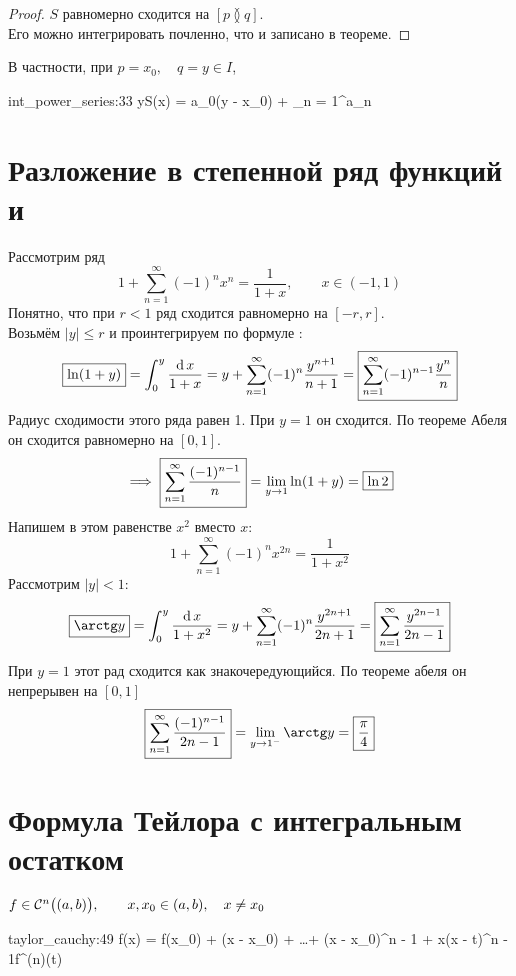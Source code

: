 \begin{proof}
	$ S $ равномерно сходится на $ [p \between q] $. \\
	Его можно интегрировать почленно, что и записано в теореме.
\end{proof}

\begin{statement}
	В частности, при $ p = x_0, \quad q = y \in I $,
	\begin{equ}{int_power_series:33}
		y{S(x)} = a_0(y - x_0) + \sum_{n = 1}^\infty a_n 
	\end{equ}
\end{statement}

\section{Разложение в степенной ряд функций  и }

Рассмотрим ряд
$$ 1 + \sum_{n = 1}^\infty (-1)^nx^n = \frac1{1 + x}, \qquad x \in (-1, 1) $$
Понятно, что при $ r < 1 $ ряд сходится равномерно на $ [-r, r] $. \\
Возьмём $ |y| \le r $ и проинтегрируем по формуле :
$$ \boxed{\ln (1 + y)} = \dfint0y{1 + x} = y + \sum_{n = 1}^\infty (-1)^n \frac{y^{n + 1}}{n + 1} = \boxed{\sum_{n = 1}^\infty (-1)^{n - 1} \frac{y^n}n} $$
Радиус сходимости этого ряда равен 1. При $ y = 1 $ он сходится. По теореме Абеля он сходится равномерно на $ [0, 1] $.
$$ \implies \boxed{\sum_{n = 1}^\infty \frac{(-1)^{n - 1}}n} = \liml{y \to 1} \ln(1 + y) = \boxed{\ln 2} $$
Напишем в этом равенстве $ x^2 $ вместо $ x $:
$$ 1 + \sum_{n = 1}^\infty (-1)^n x^{2n} = \frac1{1 + x^2} $$
Рассмотрим $ |y| < 1 $:
$$ \boxed{\arctg y} = \dfint0y{1 + x^2} = y + \sum_{n = 1}^\infty (-1)^n \frac{y^{2n + 1}}{2n + 1} = \boxed{\sum_{n = 1}^\infty \frac{y^{2n - 1}}{2n - 1}} $$
При $ y = 1 $ этот рад сходится как знакочередующийся. По теореме абеля он непрерывен на $ [0, 1] $
$$ \boxed{\sum_{n = 1}^\infty \frac{(-1)^{n - 1}}{2n - 1}} = \liml{y \to 1^-} \arctg y = \boxed{\frac\pi4} $$

\section{Формула Тейлора с интегральным остатком}

\begin{theorem}
	$ f \in \Cont[n]{(a, b)}, \qquad x, x_0 \in (a, b), \quad x \ne x_0 $
	\begin{equ}{taylor_cauchy:49}
		\implies f(x) = f(x_0) + (x - x_0) + \dots + (x - x_0)^{n - 1} +  x{(x - t)^{n - 1}f^{(n)}(t)}
	\end{equ}
\end{theorem}

